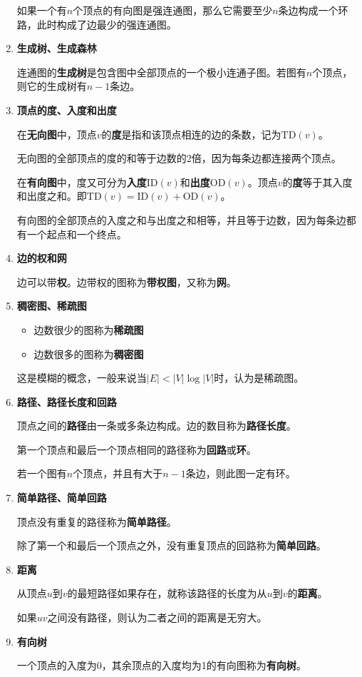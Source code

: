 \documentclass[12pt, a4paper, oneside]{ctexart}
\begin{document}
\begin{enumerate}
  如果一个有$n$个顶点的有向图是强连通图，那么它需要至少$n$条边构成一个环路，此时构成了边最少的强连通图。

  \item {\bf 生成树、生成森林}
  
  连通图的\textbf{生成树}是包含图中全部顶点的一个极小连通子图。若图有$n$个顶点，则它的生成树有$n-1$条边。

  \item {\bf 顶点的度、入度和出度}
  
  在\textbf{无向图}中，顶点$v$的\textbf{度}是指和该顶点相连的边的条数，记为$\text{TD}(v)$。

  无向图的全部顶点的度的和等于边数的2倍，因为每条边都连接两个顶点。

  在\textbf{有向图}中，度又可分为\textbf{入度}$\text{ID}(v)$和\textbf{出度}$\text{OD}(v)$。顶点$v$的\textbf{度}等于其入度和出度之和。即$\text{TD}(v)=\text{ID}(v)+\text{OD}(v)$。

  有向图的全部顶点的入度之和与出度之和相等，并且等于边数，因为每条边都有一个起点和一个终点。

  \item {\bf 边的权和网}
  
  边可以带\textbf{权}。边带权的图称为\textbf{带权图}，又称为\textbf{网}。

  \item {\bf 稠密图、稀疏图}
  
  \begin{itemize}
    \item 边数很少的图称为\textbf{稀疏图}
    \item 边数很多的图称为\textbf{稠密图}
  \end{itemize}

  这是模糊的概念，一般来说当$\lvert E\rvert <\lvert V\rvert \log \lvert V\rvert$时，认为是稀疏图。

  \item {\bf 路径、路径长度和回路}
  
  顶点之间的\textbf{路径}由一条或多条边构成。边的数目称为\textbf{路径长度}。

  第一个顶点和最后一个顶点相同的路径称为\textbf{回路}或\textbf{环}。

  若一个图有$n$个顶点，并且有大于$n-1$条边，则此图一定有环。

  \item {\bf 简单路径、简单回路}
  
  顶点没有重复的路径称为\textbf{简单路径}。

  除了第一个和最后一个顶点之外，没有重复顶点的回路称为\textbf{简单回路}。

  \item {\bf 距离}
  
  从顶点$u$到$v$的最短路径如果存在，就称该路径的长度为从$u$到$v$的\textbf{距离}。

  如果$uv$之间没有路径，则认为二者之间的距离是无穷大。

  \item {\bf 有向树}
  
  一个顶点的入度为0，其余顶点的入度均为1的有向图称为\textbf{有向树}。

\end{enumerate}
\end{document}
